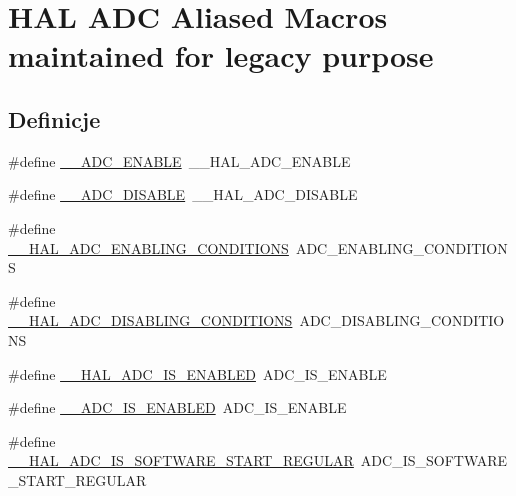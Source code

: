 \hypertarget{group___h_a_l___a_d_c___aliased___macros}{}\section{H\+AL A\+DC Aliased Macros maintained for legacy purpose}
\label{group___h_a_l___a_d_c___aliased___macros}
\subsection*{Definicje}
\begin{DoxyCompactItemize}
\item 
\#define \hyperlink{group___h_a_l___a_d_c___aliased___macros_gade2e452da8695130dbc0b8b516ec16ff}{\+\_\+\+\_\+\+A\+D\+C\+\_\+\+E\+N\+A\+B\+LE}~\+\_\+\+\_\+\+H\+A\+L\+\_\+\+A\+D\+C\+\_\+\+E\+N\+A\+B\+LE
\item 
\#define \hyperlink{group___h_a_l___a_d_c___aliased___macros_ga6a8dfa9e047c1ac8f70d2fe3ae3fd4dc}{\+\_\+\+\_\+\+A\+D\+C\+\_\+\+D\+I\+S\+A\+B\+LE}~\+\_\+\+\_\+\+H\+A\+L\+\_\+\+A\+D\+C\+\_\+\+D\+I\+S\+A\+B\+LE
\item 
\#define \hyperlink{group___h_a_l___a_d_c___aliased___macros_gaf09405aa65148ec822984b2d81992596}{\+\_\+\+\_\+\+H\+A\+L\+\_\+\+A\+D\+C\+\_\+\+E\+N\+A\+B\+L\+I\+N\+G\+\_\+\+C\+O\+N\+D\+I\+T\+I\+O\+NS}~A\+D\+C\+\_\+\+E\+N\+A\+B\+L\+I\+N\+G\+\_\+\+C\+O\+N\+D\+I\+T\+I\+O\+NS
\item 
\#define \hyperlink{group___h_a_l___a_d_c___aliased___macros_ga758e02a9d4e37528e42ff60eff476cbf}{\+\_\+\+\_\+\+H\+A\+L\+\_\+\+A\+D\+C\+\_\+\+D\+I\+S\+A\+B\+L\+I\+N\+G\+\_\+\+C\+O\+N\+D\+I\+T\+I\+O\+NS}~A\+D\+C\+\_\+\+D\+I\+S\+A\+B\+L\+I\+N\+G\+\_\+\+C\+O\+N\+D\+I\+T\+I\+O\+NS
\item 
\#define \hyperlink{group___h_a_l___a_d_c___aliased___macros_ga2c78554d5c9d8311297ea8fb01866309}{\+\_\+\+\_\+\+H\+A\+L\+\_\+\+A\+D\+C\+\_\+\+I\+S\+\_\+\+E\+N\+A\+B\+L\+ED}~A\+D\+C\+\_\+\+I\+S\+\_\+\+E\+N\+A\+B\+LE
\item 
\#define \hyperlink{group___h_a_l___a_d_c___aliased___macros_ga32e5ccb7060b98a06749eb20d922d51b}{\+\_\+\+\_\+\+A\+D\+C\+\_\+\+I\+S\+\_\+\+E\+N\+A\+B\+L\+ED}~A\+D\+C\+\_\+\+I\+S\+\_\+\+E\+N\+A\+B\+LE
\item 
\#define \hyperlink{group___h_a_l___a_d_c___aliased___macros_gad995b81efb72f4fe37152863d465bace}{\+\_\+\+\_\+\+H\+A\+L\+\_\+\+A\+D\+C\+\_\+\+I\+S\+\_\+\+S\+O\+F\+T\+W\+A\+R\+E\+\_\+\+S\+T\+A\+R\+T\+\_\+\+R\+E\+G\+U\+L\+AR}~A\+D\+C\+\_\+\+I\+S\+\_\+\+S\+O\+F\+T\+W\+A\+R\+E\+\_\+\+S\+T\+A\+R\+T\+\_\+\+R\+E\+G\+U\+L\+AR

\end{DoxyCompactItemize}

